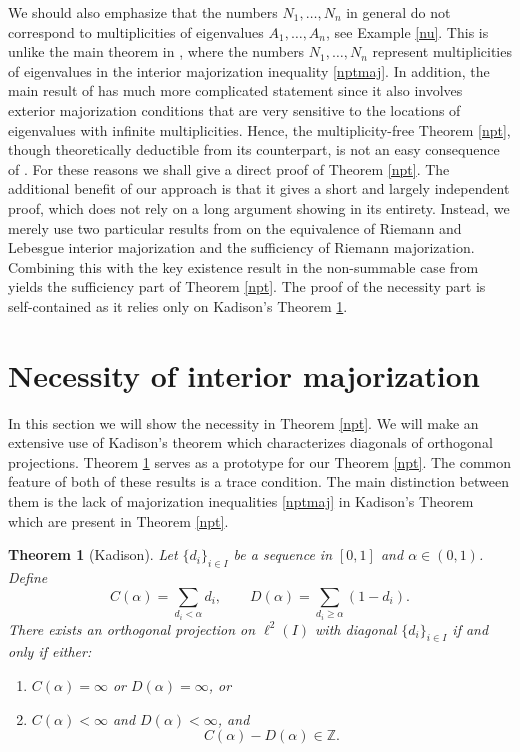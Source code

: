 \documentclass[12pt]{amsart}
\newcounter{Theorem}
\numberwithin{equation}{section}
\numberwithin{Theorem}{section}
\theoremstyle{plain}
\newtheorem{thm}[Theorem]{Theorem}
\theoremstyle{definition}
\theoremstyle{remark}
\begin{document}
We should also emphasize that the numbers $N_1,\ldots,N_n$ in general do  not correspond to multiplicities of eigenvalues $A_1,\ldots,A_n$, see Example \ref{nu}. This is unlike the main theorem in \cite{mbjj3}, where the numbers $N_1,\ldots,N_n$ represent multiplicities of eigenvalues in the interior majorization inequality \eqref{nptmaj}. In addition, the main result of \cite{mbjj3} has much more complicated statement since it also involves exterior majorization conditions that are very sensitive to the locations of eigenvalues with infinite multiplicities. Hence, the multiplicity-free Theorem \ref{npt}, though theoretically deductible from its counterpart, is not an easy consequence of \cite{mbjj3}. 
For these reasons we shall give a direct proof of Theorem \ref{npt}. The additional benefit of our approach is that it gives a short and largely independent proof, which does not rely on a long argument showing \cite[Theorem 1.3]{mbjj3} in its entirety. Instead, we merely use two particular results from \cite{mbjj3} on the equivalence of Riemann and Lebesgue interior majorization and the sufficiency of Riemann majorization. Combining this with the key  existence result in the non-summable case from \cite{jj} yields the sufficiency part of Theorem \ref{npt}. The proof of the necessity part is self-contained as it relies only on Kadison's Theorem \ref{Kadison}.

\section{Necessity of interior majorization}\label{S4}

In this section we will show the necessity in Theorem \ref{npt}. We will make an extensive use of Kadison's theorem \cite{k1,k2} which characterizes diagonals of orthogonal projections. Theorem \ref{Kadison} serves as a prototype for our Theorem \ref{npt}. The common feature of both of these results is a trace condition. The main distinction between them is the lack of majorization inequalities \eqref{nptmaj} in Kadison's Theorem which are present in Theorem \ref{npt}.

\begin{thm}[Kadison]
\label{Kadison} Let $\{d_{i}\}_{i\in I}$ be a sequence in $[0,1]$ and $\alpha\in(0,1)$. Define
\[
C(\alpha)=\sum_{d_{i}<\alpha}d_{i}, \qquad D(\alpha)=\sum_{d_{i}\geq \alpha}(1-d_{i}).\]
There exists an orthogonal projection on $\ell^2(I)$ with diagonal $\{d_{i}\}_{i\in I}$ if and only if either:
\begin{enumerate}
\item $C(\alpha)=\infty$ or $D(\alpha)=\infty$, or
\item $C(\alpha)<\infty$ and $D(\alpha)<\infty$, and
\begin{equation}
\label{kadcond} 
C(\alpha)-D(\alpha)\in{\mathbb{Z}}.
\end{equation}
\end{enumerate}
\end{thm}
\end{document}
